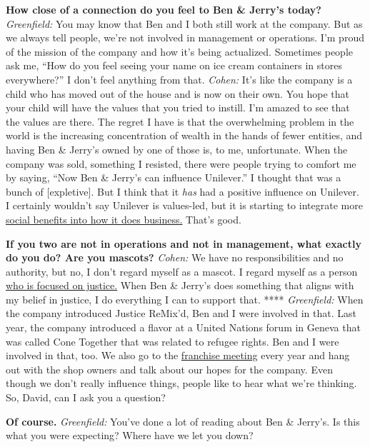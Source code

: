 \textbf{How close of a connection do you feel to Ben \& Jerry's today?}
\emph{Greenfield:} You may know that Ben and I both still work at the
company. But as we always tell people, we're not involved in management
or operations. I'm proud of the mission of the company and how it's
being actualized. Sometimes people ask me, ``How do you feel seeing your
name on ice cream containers in stores everywhere?'' I don't feel
anything from that. \emph{Cohen:} It's like the company is a child who
has moved out of the house and is now on their own. You hope that your
child will have the values that you tried to instill. I'm amazed to see
that the values are there. The regret I have is that the overwhelming
problem in the world is the increasing concentration of wealth in the
hands of fewer entities, and having Ben \& Jerry's owned by one of those
is, to me, unfortunate. When the company was sold, something I resisted,
there were people trying to comfort me by saying, ``Now Ben \& Jerry's
can influence Unilever.'' I thought that was a bunch of {[}expletive{]}.
But I think that it \emph{has} had a positive influence on Unilever. I
certainly wouldn't say Unilever is values-led, but it is starting to
integrate more \href{http://nytimes.com\#tooltip-10}{social benefits
into how it does business.} That's good.

\textbf{If you two are not in operations and not in management, what
exactly do you do? Are you mascots?} \emph{Cohen:} We have no
responsibilities and no authority, but no, I don't regard myself as a
mascot. I regard myself as a person
\href{http://nytimes.com\#tooltip-11}{who is focused on justice.} When
Ben \& Jerry's does something that aligns with my belief in justice, I
do everything I can to support that. **** \emph{Greenfield:} When the
company introduced Justice ReMix'd, Ben and I were involved in that.
Last year, the company introduced a flavor at a United Nations forum in
Geneva that was called Cone Together that was related to refugee rights.
Ben and I were involved in that, too. We also go to the
\href{http://nytimes.com\#tooltip-12}{franchise meeting} every year and
hang out with the shop owners and talk about our hopes for the company.
Even though we don't really influence things, people like to hear what
we're thinking. So, David, can I ask you a question?

\textbf{Of course.} \emph{Greenfield:} You've done a lot of reading
about Ben \& Jerry's. Is this what you were expecting? Where have we let
you down?

